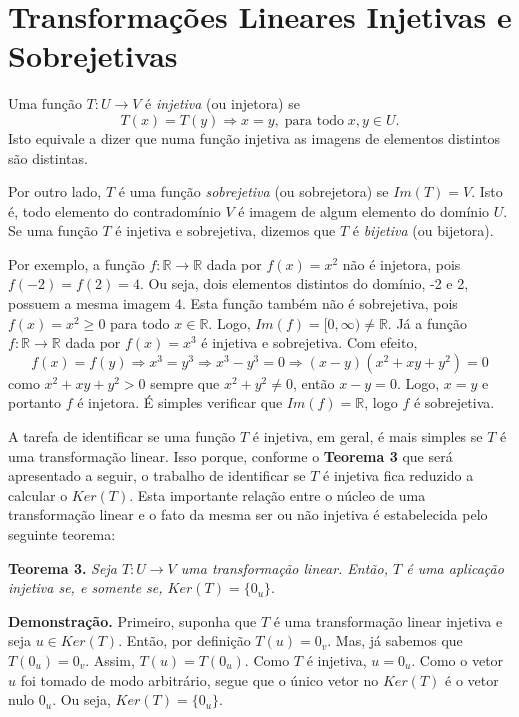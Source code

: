 \section{Transformações Lineares Injetivas e Sobrejetivas}

Uma função  $T: U \rightarrow V$ é \textit{injetiva} (ou injetora)  se  $$T(x)=T(y) \Rightarrow x=y,\; \text{para todo}\; x, y \in U.$$ Isto equivale a dizer que numa função injetiva  as imagens de elementos distintos são distintas.

 Por outro lado, $T$ é uma função \textit{sobrejetiva} (ou sobrejetora) se $Im(T)=V$. Isto é, todo elemento do contradomínio $V$ é  imagem de algum elemento do domínio $U$. Se uma função $T$ é injetiva e sobrejetiva,  dizemos que $T$ é \textit{bijetiva} (ou bijetora).

Por exemplo, a função $f: \mathbb{R} \rightarrow \mathbb{R}$ dada por $f(x)=x^2$ não é injetora, pois $f(-2)=f(2)=4$. Ou seja, dois elementos distintos do domínio, -2 e 2,  possuem a mesma imagem 4.  Esta função também não  é sobrejetiva, pois $f(x)=x^2 \geq 0$ para todo $x\in \mathbb{R}$. Logo, $Im(f)=[0, \infty) \neq \mathbb{R}$. Já a função $f: \mathbb{R} \rightarrow \mathbb{R}$ dada por $f(x)=x^3$ é injetiva e sobrejetiva. Com efeito, $$f(x)=f(y) \Rightarrow x^3=y^3 \Rightarrow x^3 - y^3=0 \Rightarrow (x-y)(x^2+xy+y^2)=0$$ como $x^2+xy+y^2 > 0$ sempre que $x^2+y^2 \neq 0$, então $x-y=0$. Logo, $x=y$ e portanto $f$ é injetora. É simples verificar que $Im(f)=\mathbb{R}$, logo $f$  é sobrejetiva.

\vspace{1cm}
A tarefa de identificar se uma função $T$ é injetiva, em  geral, é  mais simples se $T$ é uma transformação linear.  Isso porque, conforme o \textbf{Teorema 3} que será apresentado a seguir, o trabalho de identificar se $T$ é injetiva fica reduzido a calcular o $Ker(T)$.  Esta  importante relação entre o núcleo de uma transformação linear e o fato da mesma  ser ou não  injetiva é estabelecida pelo seguinte teorema:

\vspace{1cm}
\noindent \textbf{Teorema 3.} \textit{Seja $T: U \rightarrow V$ uma transformação linear. Então, $T$ é uma aplicação injetiva se, e somente se, $Ker(T)=\{0_u\}.$}

\vspace{0.3cm}
\noindent \textbf{Demonstração.} Primeiro, suponha que $T$ é uma transformação linear injetiva e seja $u\in Ker(T)$. Então, por definição $T(u)=0_v$. Mas, já sabemos que  $T(0_u)=0_v$. Assim, $T(u)=T(0_u)$. Como $T$ é injetiva, $u=0_u$. Como o vetor $u$ foi tomado de modo arbitrário, segue que o único vetor no $ Ker(T)$ é o vetor nulo $0_u$. Ou seja, $ Ker(T)= \{0_u\}$.

